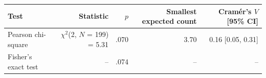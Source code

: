 \begin{tabular}{lrrrr}
  \toprule
Test & Statistic & $p$ & Smallest expected count & Cram\'er's $V$ [95\% CI] \\ 
  \midrule
Pearson chi-square & $\chi^2$(2, $N$ = 199) = 5.31 & .070 & 3.70 & 0.16 [0.05, 0.31] \\ 
  Fisher's exact test & -- & .074 & -- & -- \\ 
   \bottomrule
\end{tabular}
